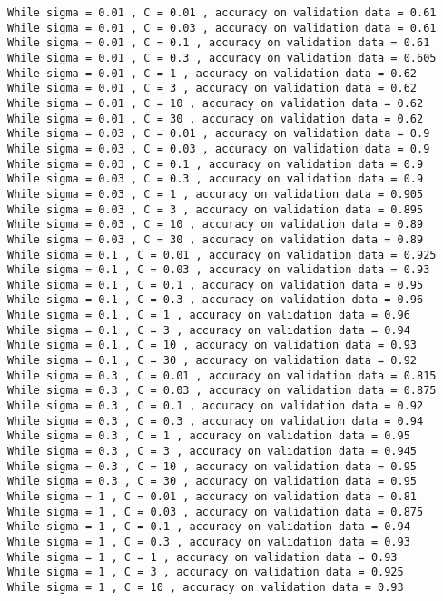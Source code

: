 \documentclass[11pt]{article}
\begin{document}
    \begin{Verbatim}[commandchars=\\\{\}]
While sigma = 0.01 , C = 0.01 , accuracy on validation data = 0.61
While sigma = 0.01 , C = 0.03 , accuracy on validation data = 0.61
While sigma = 0.01 , C = 0.1 , accuracy on validation data = 0.61
While sigma = 0.01 , C = 0.3 , accuracy on validation data = 0.605
While sigma = 0.01 , C = 1 , accuracy on validation data = 0.62
While sigma = 0.01 , C = 3 , accuracy on validation data = 0.62
While sigma = 0.01 , C = 10 , accuracy on validation data = 0.62
While sigma = 0.01 , C = 30 , accuracy on validation data = 0.62
While sigma = 0.03 , C = 0.01 , accuracy on validation data = 0.9
While sigma = 0.03 , C = 0.03 , accuracy on validation data = 0.9
While sigma = 0.03 , C = 0.1 , accuracy on validation data = 0.9
While sigma = 0.03 , C = 0.3 , accuracy on validation data = 0.9
While sigma = 0.03 , C = 1 , accuracy on validation data = 0.905
While sigma = 0.03 , C = 3 , accuracy on validation data = 0.895
While sigma = 0.03 , C = 10 , accuracy on validation data = 0.89
While sigma = 0.03 , C = 30 , accuracy on validation data = 0.89
While sigma = 0.1 , C = 0.01 , accuracy on validation data = 0.925
While sigma = 0.1 , C = 0.03 , accuracy on validation data = 0.93
While sigma = 0.1 , C = 0.1 , accuracy on validation data = 0.95
While sigma = 0.1 , C = 0.3 , accuracy on validation data = 0.96
While sigma = 0.1 , C = 1 , accuracy on validation data = 0.96
While sigma = 0.1 , C = 3 , accuracy on validation data = 0.94
While sigma = 0.1 , C = 10 , accuracy on validation data = 0.93
While sigma = 0.1 , C = 30 , accuracy on validation data = 0.92
While sigma = 0.3 , C = 0.01 , accuracy on validation data = 0.815
While sigma = 0.3 , C = 0.03 , accuracy on validation data = 0.875
While sigma = 0.3 , C = 0.1 , accuracy on validation data = 0.92
While sigma = 0.3 , C = 0.3 , accuracy on validation data = 0.94
While sigma = 0.3 , C = 1 , accuracy on validation data = 0.95
While sigma = 0.3 , C = 3 , accuracy on validation data = 0.945
While sigma = 0.3 , C = 10 , accuracy on validation data = 0.95
While sigma = 0.3 , C = 30 , accuracy on validation data = 0.95
While sigma = 1 , C = 0.01 , accuracy on validation data = 0.81
While sigma = 1 , C = 0.03 , accuracy on validation data = 0.875
While sigma = 1 , C = 0.1 , accuracy on validation data = 0.94
While sigma = 1 , C = 0.3 , accuracy on validation data = 0.93
While sigma = 1 , C = 1 , accuracy on validation data = 0.93
While sigma = 1 , C = 3 , accuracy on validation data = 0.925
While sigma = 1 , C = 10 , accuracy on validation data = 0.93

\end{Verbatim}
\end{document}
